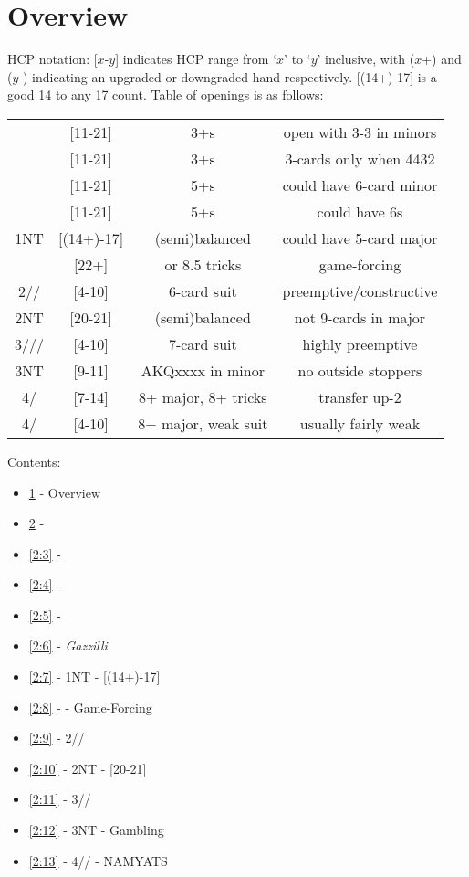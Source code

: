 \documentclass[12pt]{report}
\newcommand{\n}{\\}
\newcommand{\q}[1]{\multido{}{#1}{\qquad}}
\newcommand{\ul}[1]{\begin{itemize}#1\end{itemize}}
\newcommand{\li}[1]{\item[~] \q{#1}}
\newcommand{\bidsection}[2]{\section{\texorpdfstring{#1}{#2}}}
\begin{document}
\section{Overview} \label{2:1}
    HCP notation: [$x$-$y$] indicates HCP range from `$x$' to `$y$' inclusive, with ($x$+) and ($y$-) indicating an upgraded or downgraded hand respectively.  [(14+)-17] is a good 14 to any 17 count. Table of openings is as follows:
    
\begin{center}
    \begin{tabular}{ |c|c|c|c| } 
        \hline
        \cl1                     & [11-21]    & 3+\cl{}s             & open with 3-3 in minors \n
        \di1                     & [11-21]    & 3+\di{}s             & 3-cards only when 4432  \n
        \he1                     & [11-21]    & 5+\he{}s             & could have 6-card minor \n
        \sp1                     & [11-21]    & 5+\sp{}s             & could have 6\he{}s      \n
        1NT                      & [(14+)-17] & (semi)balanced       & could have 5-card major \n
        \cl2                     & [22+]      & or 8.5 tricks        & game-forcing            \n
        2\di{}/\he{}/\sp{}       & [4-10]     & 6-card suit          & preemptive/constructive \n
        2NT                      & [20-21]    & (semi)balanced       & not 9-cards in major    \n
        3\cl{}/\di{}/\he{}/\sp{} & [4-10]     & 7-card suit          & highly preemptive       \n
        3NT                      & [9-11]     & AKQxxxx in minor     & no outside stoppers     \n
        4\cl{}/\di{}             & [7-14]     & 8+ major, 8+ tricks  & transfer up-2           \n
        4\he{}/\sp{}             & [4-10]     & 8+ major, weak suit  & usually fairly weak     \n
        \hline
    \end{tabular}
\end{center}
Contents:
\ul {
    \li0 \ref{2:1} - Overview
    \li0 \ref{2:2} - 
    \li0 \ref{2:3} - \di1
    \li0 \ref{2:4} - \he1
    \li0 \ref{2:5} - \sp1
    \li0 \ref{2:6} - \textit{Gazzilli}
    \li0 \ref{2:7} - 1NT - [(14+)-17]
    \li0 \ref{2:8} - \cl2 - Game-Forcing
    \li0 \ref{2:9} - 2\di{}/\he{}/\sp{}
    \li0 \ref{2:10} - 2NT - [20-21]
    \li0 \ref{2:11} - 3\cl{}/\di{}/\sp{}
    \li0 \ref{2:12} - 3NT - Gambling
    \li0 \ref{2:13} - 4\cl{}/\di{}/\he{}\sp{} - NAMYATS
}
\newpage
\bidsection{}{1♣} \label{2:2}
\end{document}
